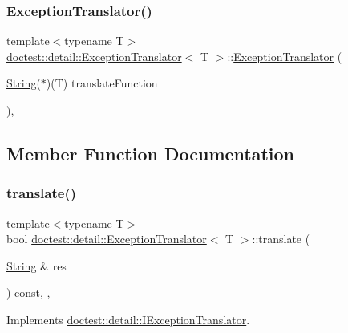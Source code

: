\subsubsection{\texorpdfstring{Exception\+Translator()}{ExceptionTranslator()}}
{\footnotesize\ttfamily template$<$typename T$>$ \\
\hyperlink{classdoctest_1_1detail_1_1_exception_translator}{doctest\+::detail\+::\+Exception\+Translator}$<$ T $>$\+::\hyperlink{classdoctest_1_1detail_1_1_exception_translator}{Exception\+Translator} (\begin{DoxyParamCaption}\item[{\hyperlink{classdoctest_1_1_string}{String}($\ast$)(T)}]{translate\+Function }\end{DoxyParamCaption})\hspace{0.3cm}{\ttfamily [inline]}, {\ttfamily [explicit]}}



\subsection{Member Function Documentation}
\mbox{\label{classdoctest_1_1detail_1_1_exception_translator_a56484c4218a06bbbd1548335a8b64110}} 
\subsubsection{\texorpdfstring{translate()}{translate()}}
{\footnotesize\ttfamily template$<$typename T$>$ \\
bool \hyperlink{classdoctest_1_1detail_1_1_exception_translator}{doctest\+::detail\+::\+Exception\+Translator}$<$ T $>$\+::translate (\begin{DoxyParamCaption}\item[{\hyperlink{classdoctest_1_1_string}{String} \&}]{res }\end{DoxyParamCaption}) const\hspace{0.3cm}{\ttfamily [inline]}, {\ttfamily [override]}, {\ttfamily [virtual]}}



Implements \hyperlink{structdoctest_1_1detail_1_1_i_exception_translator_a9c56005e4c83c13b859cc2e31102bfbc}{doctest\+::detail\+::\+I\+Exception\+Translator}.


